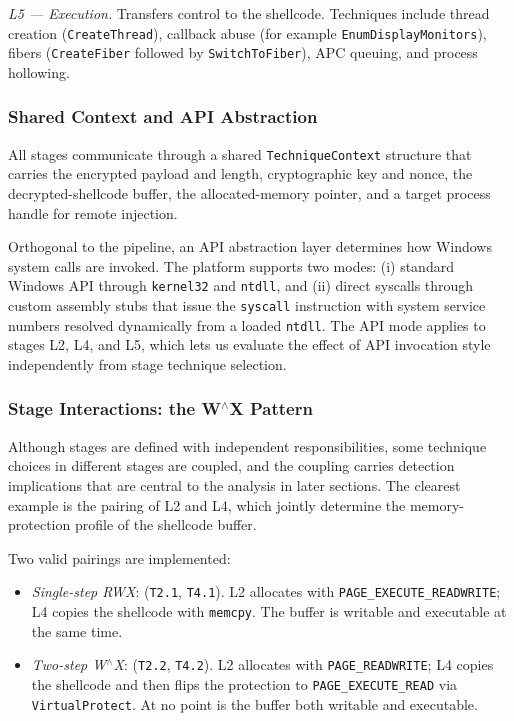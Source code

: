 \textit{L5 --- Execution.}
Transfers control to the shellcode.
Techniques include thread creation (\texttt{CreateThread}), callback abuse (for example \texttt{EnumDisplayMonitors}), fibers (\texttt{CreateFiber} followed by \texttt{SwitchToFiber}), APC queuing, and process hollowing.

\subsubsection{Shared Context and API Abstraction}

All stages communicate through a shared \texttt{TechniqueContext} structure that carries the encrypted payload and length, cryptographic key and nonce, the decrypted-shellcode buffer, the allocated-memory pointer, and a target process handle for remote injection.

Orthogonal to the pipeline, an API abstraction layer determines how Windows system calls are invoked.
The platform supports two modes: (i) standard Windows API through \texttt{kernel32} and \texttt{ntdll}, and (ii) direct syscalls through custom assembly stubs that issue the \texttt{syscall} instruction with system service numbers resolved dynamically from a loaded \texttt{ntdll}.
The API mode applies to stages L2, L4, and L5, which lets us evaluate the effect of API invocation style independently from stage technique selection.

\subsubsection{Stage Interactions: the W\texorpdfstring{$^{\wedge}$}{\textasciicircum}X Pattern}
\label{sec:wxpattern}

Although stages are defined with independent responsibilities, some technique choices in different stages are coupled, and the coupling carries detection implications that are central to the analysis in later sections.
The clearest example is the pairing of L2 and L4, which jointly determine the memory-protection profile of the shellcode buffer.

Two valid pairings are implemented:

\begin{itemize}[leftmargin=*, itemsep=2pt]
    \item \textit{Single-step RWX}: (\texttt{T2.1}, \texttt{T4.1}).
    L2 allocates with \texttt{PAGE\_EXECUTE\_READWRITE}; L4 copies the shellcode with \texttt{memcpy}.
    The buffer is writable and executable at the same time.

    \item \textit{Two-step W$^{\wedge}$X}: (\texttt{T2.2}, \texttt{T4.2}).
    L2 allocates with \texttt{PAGE\_READWRITE}; L4 copies the shellcode and then flips the protection to \texttt{PAGE\_EXECUTE\_READ} via \texttt{VirtualProtect}.
    At no point is the buffer both writable and executable.
\end{itemize}

